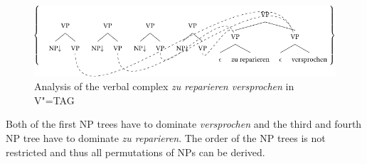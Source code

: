 \begin{figure}
\centerline{%
\includegraphics{Figures/tag-zu-reparieren-versprochen-vtag-cropped}
}
\caption{\label{Abbildung-zu-reparieren-versprochen-V-TAG}Analysis of the verbal complex \emph{zu reparieren versprochen} in V"=TAG}
\end{figure}%
Both of the first NP trees have to dominate \emph{versprochen} and the third and fourth NP tree have to dominate \emph{zu reparieren}.
The order of the NP trees is not restricted and thus all permutations of NPs can be derived.

